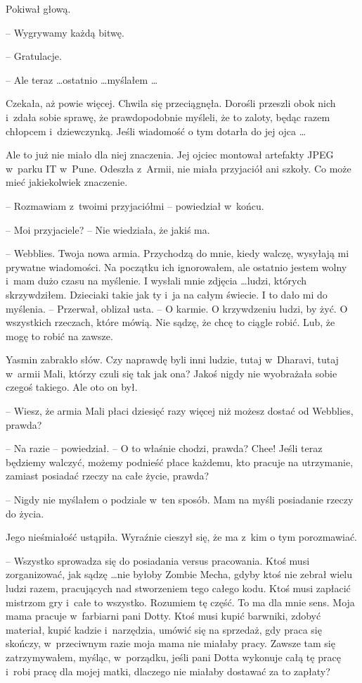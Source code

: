\documentclass[oneside,polish,11pt,rmheadings]{mwbk}
\begin{document}
Pokiwał głową. 

-- Wygrywamy każdą bitwę.

-- Gratulacje. 

-- Ale teraz \ldots  ostatnio \ldots  myślałem \ldots 

Czekała, aż powie więcej. Chwila się przeciągnęła. Dorośli przeszli obok nich i~zdała sobie sprawę, że prawdopodobnie myśleli, że to zaloty, będąc razem chłopcem i~dziewczynką. Jeśli wiadomość o tym dotarła do jej ojca \ldots 

Ale to już nie miało dla niej znaczenia. Jej ojciec montował artefakty JPEG w~parku IT w~Pune. Odeszła z~Armii, nie miała przyjaciół ani szkoły. Co może mieć jakiekolwiek znaczenie.

-- Rozmawiam z~twoimi przyjaciółmi -- powiedział w~końcu.

-- Moi przyjaciele? -- Nie wiedziała, że jakiś ma.

-- Webblies. Twoja nowa armia. Przychodzą do mnie, kiedy walczę, wysyłają mi prywatne wiadomości. Na początku ich ignorowałem, ale ostatnio jestem wolny i~mam dużo czasu na myślenie. I wysłali mnie zdjęcia \ldots  ludzi, których skrzywdziłem. Dzieciaki takie jak ty i~ja na całym świecie. I to dało mi do myślenia. -- Przerwał, oblizał usta. -- O karmie. O krzywdzeniu ludzi, by żyć. O wszystkich rzeczach, które mówią. Nie sądzę, że chcę to ciągle robić. Lub, że mogę to robić na zawsze.

Yasmin zabrakło słów. Czy naprawdę byli inni ludzie, tutaj w~Dharavi, tutaj w~armii Mali, którzy czuli się tak jak ona? Jakoś nigdy nie wyobrażała sobie czegoś takiego. Ale oto on był.

-- Wiesz, że armia Mali płaci dziesięć razy więcej niż możesz dostać od Webblies, prawda?

-- Na razie -- powiedział. -- O to właśnie chodzi, prawda? Chee! Jeśli teraz będziemy walczyć, możemy podnieść płace każdemu, kto pracuje na utrzymanie, zamiast posiadać rzeczy na całe życie, prawda?

-- Nigdy nie myślałem o podziale w~ten sposób. Mam na myśli posiadanie rzeczy do życia.

Jego nieśmiałość ustąpiła. Wyraźnie cieszył się, że ma z~kim o tym porozmawiać. 

-- Wszystko sprowadza się do posiadania versus pracowania. Ktoś musi zorganizować, jak sądzę  \ldots  nie byłoby Zombie Mecha, gdyby ktoś nie zebrał wielu ludzi razem, pracujących nad stworzeniem tego całego kodu. Ktoś musi zapłacić mistrzom gry i~całe to wszystko. Rozumiem tę część. To ma dla mnie sens. Moja mama pracuje w~farbiarni pani Dotty. Ktoś musi kupić barwniki, zdobyć materiał, kupić kadzie i~narzędzia, umówić się na sprzedaż, gdy praca się skończy, w~przeciwnym razie moja mama nie miałaby pracy. Zawsze tam się zatrzymywałem, myśląc, w~porządku, jeśli pani Dotta wykonuje całą tę pracę i~robi pracę dla mojej matki, dlaczego nie miałaby dostawać za to zapłaty?
\end{document}

